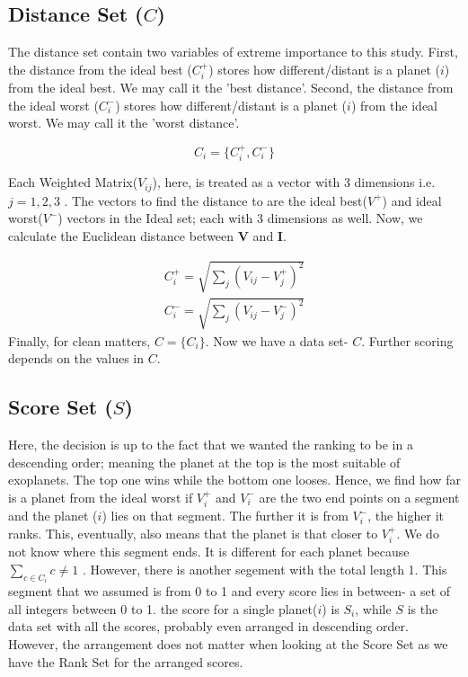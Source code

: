 \documentclass[12pt]{article}
\begin{document}
\subsection{Distance Set ($C$)\label{subsec: distance set}}
The distance set contain two variables of extreme importance to this study. First, the distance from the ideal best ($C_i^+$) stores how different/distant is a planet ($i$) from the ideal best. We may call it the 'best distance'. Second, the distance from the ideal worst ($C_i^-$) stores how different/distant is a planet ($i$) from the ideal worst. We may call it the 'worst distance'.

\begin{equation*}
    C_i=\{C_i^+ , C^-_i\}
\end{equation*}\vspace{1em}

Each Weighted Matrix($V_{ij}$), here, is treated as a vector with 3 dimensions i.e. $j=1,2,3$ . The vectors to find the distance to are the ideal best($V^+$) and ideal worst($V^-$) vectors in the Ideal set; each with 3 dimensions as well. Now, we calculate the Euclidean distance between $\mathbf{V}$ and $\mathbf{I}$.\vspace{1em}

\begin{align}
    C_i^+ = \sqrt{\sum_{j}(V_{ij}-V_j^+)^2} \\[2em]
    C_i^- = \sqrt{\sum_{j}(V_{ij}-V_j^-)^2}
\end{align}\vspace{1em}
Finally, for clean matters, $C=\{C_i\}$. Now we have a data set- $C$. Further scoring depends on the values in $C$.


\subsection{Score Set ($S$)} \label{Subsec:Score Set}
Here, the decision is up to the fact that we wanted the ranking to be in a descending order; meaning the planet at the top is the most suitable of exoplanets. The top one wins while the bottom one looses. Hence, we find how far is a planet from the ideal worst if $V^+_i$ and $V^-_i$ are the two end points on a segment and the planet ($i$) lies on that segment. The further it is from $V^-_i$, the higher it ranks. This, eventually, also means that the planet is that closer to $V^+_i$. We do not know where this segment ends. It is different for each planet because $\sum_{c\in C_i}c \neq 1$ . However, there is another segement with the total length 1. This segment that we assumed is from 0 to 1 and every score lies in between- a set of all integers between 0 to 1. the score for a single planet($i$) is $S_i$, while $S$ is the data set with all the scores, probably even arranged in descending order. However, the arrangement does not matter when looking at the Score Set as we have the Rank Set for the arranged scores.\vspace{0.5em}
\end{document}
